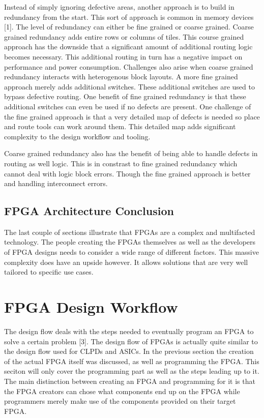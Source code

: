 \documentclass{article}
\begin{document}
    Instead of simply ignoring defective areas, another approach is to build in redundancy
    from the start. This sort of approach is common in memory devices [1]. The level of
    redundancy can either be fine grained or coarse grained. Coarse grained redundancy
    adds entire rows or columns of tiles. This course grained approach has the downside
    that a significant amount of additional routing logic becomes necessary. This
    additional routing in turn has a negative impact on performance and power consumption.
    Challenges also arise when coarse grained redundancy interacts with heterogenous
    block layouts.
    A more fine grained approach merely adds additional switches. These additional switches
    are used to bypass defective routing. One benefit of fine grained redundancy is that
    these additional switches can even be used if no defects are present.
    One challenge of the fine grained approach is that a very detailed map
    of defects is needed so place and route tools can work around them.
    This detailed map adds significant complexity to the design workflow and tooling.

    Coarse grained redundancy also has the benefit of being able to handle defects in
    routing as well logic. This is in constrast to fine grained redundancy which
    cannot deal with logic block errors. Though the fine grained approach is better
    and handling interconnect errors.

    
    \subsection{FPGA Architecture Conclusion}

    The last couple of sections illustrate that FPGAs are a complex and multifacted
    technology. The people creating the FPGAs themselves as well as the developers
    of FPGA designs needs to consider a wide range of different factors. This massive
    complexity does have an upside however. It allows solutions that are very well
    tailored to specific use cases. 
    
    
    \section{FPGA Design Workflow}

    The design flow deals with the steps needed to eventually program an FPGA
    to solve a certain problem [3]. The design flow of FPGAs is actually quite
    similar to the design flow used for CLPDs and ASICs.
    In the previous section the creation of the actual FPGA itself was discussed,
    as well as programming the FPGA. This seciton will only cover the programming
    part as well as the steps leading up to it.
    The main distinction between creating an FPGA and programming for it is that
    the FPGA creators can chose what components end up on the FPGA while programmers
    merely make use of the components provided on their target FPGA.
\end{document}
